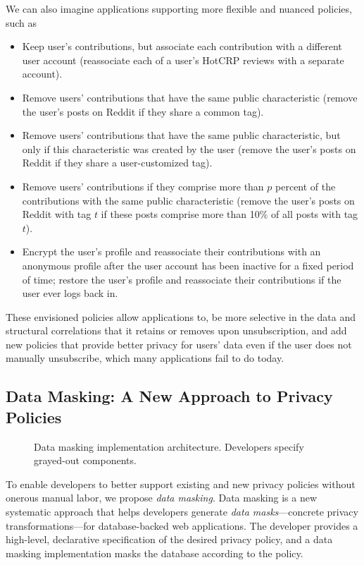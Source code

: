 We can also imagine applications supporting more flexible and nuanced policies, such as
\begin{itemize}[nosep]
    \item Keep user's contributions, but associate each contribution with a different user account
        (\eg reassociate each of a user's HotCRP reviews with a separate account).
    \item Remove users' contributions that have the same public characteristic (\eg remove the user's
       posts on Reddit if they share a common tag).
    \item Remove users' contributions that have the same public characteristic, but only if this
        characteristic was created by the user (\eg remove the user's posts on Reddit if they share
        a user-customized tag).
    \item Remove users' contributions if they comprise more than $p$
            percent of the contributions with the same public characteristic (\eg remove the user's
            posts on Reddit with tag $t$ if these posts comprise more than 10\% of all posts with
            tag $t$).
    \item Encrypt the user's profile and reassociate their contributions with an anonymous
        profile after the user account has been inactive for a fixed period of time;
        restore the user's profile and reassociate their contributions if the user ever logs back in.
\end{itemize}
These envisioned policies allow applications to, \eg be more selective in the data and structural
correlations that it retains or removes upon unsubscription, and add new policies that provide
better privacy for users' data even if the user does not manually unsubscribe, which many applications
fail to do today.

\subsection{Data Masking: A New Approach to Privacy Policies}
\begin{figure}[t!]
    \centering

    \caption{Data masking implementation architecture. Developers specify grayed-out components.}
    \label{fig:arch}
\end{figure}

To enable developers to better support existing and new privacy policies without onerous manual
labor, we propose \emph{data masking}.
%
Data masking is a new systematic approach that helps developers generate
\emph{data masks}---concrete privacy transformations---for database-backed web applications. The
developer provides a high-level, declarative specification of the desired privacy policy, and a data
masking implementation masks the database according to the policy.

